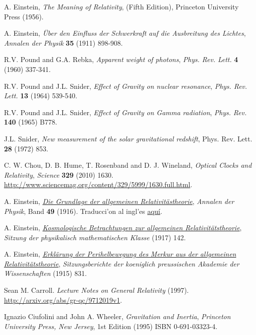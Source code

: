 \begin{thebibliography}{99}
 A. Einstein, \emph{The Meaning of Relativity}, (Fifth
Edition), Princeton University Press (1956).

 A. Einstein,  \textit{\"Uber den Einfluss der Schwerkraft auf die Ausbreitung des Lichtes},   \textsl{Annalen der Physik}   \textbf{35} (1911) 898-908.

 R.V. Pound and G.A. Rebka,  \textit{Apparent weight of photons},   \textsl{Phys. Rev. Lett.}   \textbf{4} (1960) 337-341.

 R.V. Pound and J.L. Snider,  \textit{Effect of Gravity on nuclear resonance},   \textsl{Phys. Rev. Lett.}   \textbf{13} (1964) 539-540.

 R.V. Pound and J.L. Snider,  \textit{Effect of Gravity on Gamma radiation},   \textsl{Phys. Rev.}   \textbf{140} (1965) B778.

 J.L. Snider,  \textit{New measurement of the solar gravitational redshift}, {\rm Phys. Rev. Lett.}   \textbf{28} (1972) 853.

 C. W. Chou, D. B. Hume, T. Rosenband and D. J. Wineland,  \textit{Optical Clocks and Relativity},   \textsl{Science}   \textbf{329} (2010) 1630. \url{http://www.sciencemag.org/content/329/5999/1630.full.html}.

 A. Einstein, \href{https://docs.google.com/open?id=0B4RSIcYW5V0HMWY1YzM2MjAtMmJhMy00NmQ5LWFhMjEtNjdlODhhNjcxZTFk} \textit{Die Grundlage der allgemeinen Relativitästheorie},   \textsl{Annalen der Physik}, Band   \textbf{49} (1916). Traducci'on al ingl'es \href{http://goo.gl/E2YFn}{aqu\'i}.

 A. Einstein, \href{https://goo.gl/A8miy} \textit{Kosmologische Betrachtungen zur allgemeinen Relativitätstheorie},   \textsl{Sitzung der physikalisch mathematischen Klasse} (1917) 142.

 A. Einstein, \href{https://docs.google.com/open?id=0B4RSIcYW5V0Hd0haajhUS0tRems} \textit{Erkl\"arung der Perihelbewegung des Merkur aus der allgemeinen Relativit\"atstheorie},   \textsl{Sitzungsberichte der koeniglich preussischen Akademie der Wissenschaften} (1915) 831.



 Sean M. Carroll.  \textit{Lecture Notes on General Relativity} (1997). \url{http://arxiv.org/abs/gr-qc/9712019v1}.

 Ignazio Ciufolini and John A. Wheeler,  \textit{Gravitation and Inertia},
  \textsl{Princeton University Press, New Jersey}, 1st Edition (1995) ISBN 0-691-03323-4.


\end{thebibliography}
